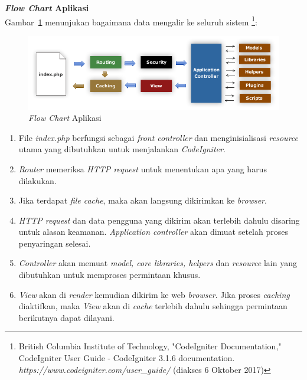 \documentclass[a4paper,twoside]{article}
\begin{document}
\begin{enumerate}
\begin{enumerate}
			\textbf{\textit{Flow Chart} Aplikasi} \\
			Gambar~\ref{fig:flow} menunjukan bagaimana data mengalir ke seluruh sistem \footnote{British Columbia Institute of Technology, "CodeIgniter Documentation," CodeIgniter User Guide - CodeIgniter 3.1.6 documentation. \textit{https://www.codeigniter.com/user\_guide/} (diakses 6 Oktober 2017)}:
			\begin{figure}[H]
				\centering  
				\includegraphics[scale=1]{appflowchart}  
				\caption[\textit{Flow Chart} Aplikasi]{\textit{Flow Chart} Aplikasi} 
				\label{fig:flow} 
			\end{figure} 
			
			\begin{enumerate}
				\item File \textit{index.php} berfungsi sebagai \textit{front controller} dan menginisialisasi \textit{resource} utama yang dibutuhkan untuk menjalankan \textit{CodeIgniter}.
				\item \textit{Router} memeriksa \textit{HTTP request} untuk menentukan apa yang harus dilakukan.
				\item Jika terdapat \textit{file cache}, maka akan langsung dikirimkan ke \textit{browser}.
				\item \textit{HTTP request} dan data pengguna yang dikirim akan terlebih dahulu disaring untuk alasan keamanan. \textit{Application controller} akan dimuat setelah proses penyaringan selesai.
				\item \textit{Controller} akan memuat \textit{model, core libraries, helpers} dan \textit{resource} lain yang dibutuhkan untuk memproses permintaan khusus.
				\item \textit{View} akan di \textit{render} kemudian dikirim ke web \textit{browser}. Jika proses \textit{caching} diaktifkan, maka \textit{View} akan di \textit{cache} terlebih dahulu sehingga permintaan berikutnya dapat dilayani.
			\end{enumerate}
			

\end{enumerate}
\end{enumerate}
\end{document}

